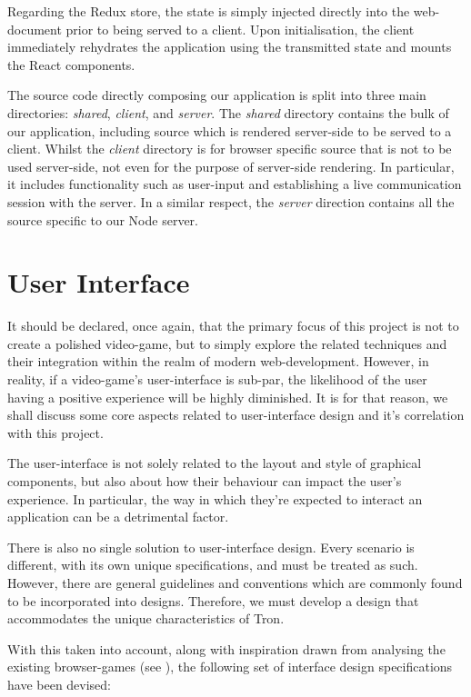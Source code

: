 \documentclass{standalone}
\begin{document}
			Regarding the Redux store, the state is simply injected directly into the web-document prior to being served to a client. Upon initialisation, the client immediately rehydrates the application using the transmitted state and mounts the React components.

			The source code directly composing our application is split into three main directories: \emph{shared}, \emph{client}, and \emph{server}. The \emph{shared} directory contains the bulk of our application, including source which is rendered server-side to be served to a client. Whilst the \emph{client} directory is for browser specific source that is not to be used server-side, not even for the purpose of server-side rendering. In particular, it includes functionality such as user-input and establishing a live communication session with the server. In a similar respect, the \emph{server} direction contains all the source specific to our Node server.

	\section{User Interface} \label{sec:userInterface}
		It should be declared, once again, that the primary focus of this project is not to create a polished video-game, but to simply explore the related techniques and their integration within the realm of modern web-development. However, in reality, if a video-game's user-interface is sub-par, the likelihood of the user having a positive experience will be highly diminished. It is for that reason, we shall discuss some core aspects related to user-interface design and it's correlation with this project.

		The user-interface is not solely related to the layout and style of graphical components, but also about how their behaviour can impact the user's experience. In particular, the way in which they're expected to interact an application can be a detrimental factor.

		There is also no single solution to user-interface design. Every scenario is different, with its own unique specifications, and must be treated as such. However, there are general guidelines and conventions which are commonly found to be incorporated into designs. Therefore, we must develop a design that accommodates the unique characteristics of Tron.

		With this taken into account, along with inspiration drawn from analysing the existing browser-games (see ), the following set of interface design specifications have been devised:
\end{document}
